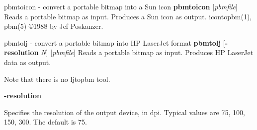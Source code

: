 %

\newpage
%

pbmtoicon - convert a portable bitmap into a Sun icon
{\bf pbmtoicon}
{\rm [}{\it pbmfile}{\rm ]}
Reads a portable bitmap as input.
Produces a Sun icon as output.
icontopbm(1), pbm(5)
\copyright 1988 by Jef Poskanzer.
%
 
%

\newpage
%

pbmtolj - convert a portable bitmap into HP LaserJet format
{\bf pbmtolj}
{\rm [}{\bf -resolution}
{\it N}{\rm ]}
{\rm [}{\it pbmfile}{\rm ]}
Reads a portable bitmap as input.
Produces HP LaserJet data as output.
\par
Note that there is no ljtopbm tool.
\begin{TPlist}{{\bf -resolution}}
\item[{{\bf -resolution}}]
Specifies the resolution of the output device, in dpi.
Typical values are 75, 100, 150, 300.
The default is 75.
\end{TPlist}

